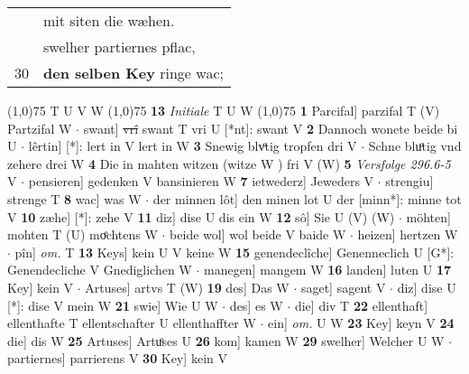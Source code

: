 \documentclass[8pt,a4paper,notitlepage]{article}
\begin{document}
\begin{table}[ht]
\begin{minipage}[t]{0.5\linewidth}
\begin{tabular}{rl}
 & mit siten die wæhen.\\ 
 & swelher partiernes pflac,\\ 
30 & \textbf{den selben Key} ringe wac;\\ 
\end{tabular}
\scriptsize
\line(1,0){75} \newline
T U V W \newline
\line(1,0){75} \newline
\textbf{13} \textit{Initiale} T U W  \newline
\line(1,0){75} \newline
\textbf{1} Parcifal] parzifal T (V) Partzifal W  $\cdot$ swant] \sout{vrî} swant T vri U [*nt]: swant V \textbf{2} Dannoch wonete beide bi U  $\cdot$ lêrtin] [*]: lert in V lert in W \textbf{3} Snewig blvͦtig tropfen dri V  $\cdot$ Schne bluͦtig vnd zehere drei W \textbf{4} Die in mahten witzen (witze W ) fri V (W) \textbf{5} \textit{Versfolge 296.6-5} V   $\cdot$ pensieren] gedenken V bansinieren W \textbf{7} ietwederz] Jeweders V  $\cdot$ strengiu] strenge T \textbf{8} wac] was W  $\cdot$ der minnen lôt] den minen lot U der [minn*]: minne tot V \textbf{10} zæhe] [*]: zehe V \textbf{11} diz] dise U dis ein W \textbf{12} sô] Sie U (V) (W)  $\cdot$ möhten] mohten T (U) moͤchtens W  $\cdot$ beide wol] wol beide V baide W  $\cdot$ heizen] hertzen W  $\cdot$ pîn] \textit{om.} T \textbf{13} Keys] kein U V keine W \textbf{15} genendeclîche] Genenneclich U [G*]: Genendecliche V Gnediglichen W  $\cdot$ manegen] mangem W \textbf{16} landen] luten U \textbf{17} Key] kein V  $\cdot$ Artuses] artvs T (W) \textbf{19} des] Das W  $\cdot$ saget] sagent V  $\cdot$ diz] dise U [*]: dise V mein W \textbf{21} swie] Wie U W  $\cdot$ des] es W  $\cdot$ die] div T \textbf{22} ellenthaft] ellenthafte T ellentschafter U ellenthaffter W  $\cdot$ ein] \textit{om.} U W \textbf{23} Key] keyn V \textbf{24} die] dis W \textbf{25} Artuses] Artuͦses U \textbf{26} kom] kamen W \textbf{29} swelher] Welcher U W  $\cdot$ partiernes] parrierens V \textbf{30} Key] kein V \newline
\end{minipage}
\end{table}
\end{document}

